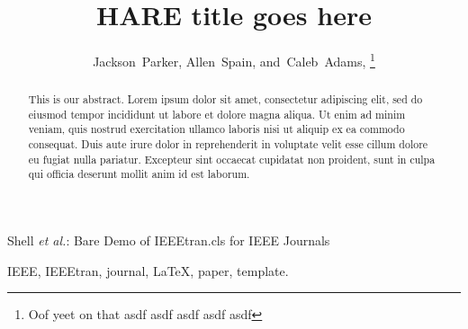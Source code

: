 \documentclass[journal]{IEEEtran}
\begin{document}
\title{HARE title goes here}

\author{Jackson~Parker,
        Allen~Spain,
        and~Caleb~Adams,
        \thanks{Oof yeet on that asdf asdf asdf asdf asdf }
        }

%
{Shell \MakeLowercase{\textit{et al.}}: Bare Demo of IEEEtran.cls for IEEE Journals}











\maketitle

\begin{abstract}
  This is our abstract. Lorem ipsum dolor sit amet, consectetur adipiscing elit,
  sed do eiusmod tempor incididunt ut labore et dolore magna aliqua. Ut enim ad
  minim veniam, quis nostrud exercitation ullamco laboris nisi ut aliquip ex ea
  commodo consequat. Duis aute irure dolor in reprehenderit in voluptate velit
  esse cillum dolore eu fugiat nulla pariatur. Excepteur sint occaecat cupidatat
  non proident, sunt in culpa qui officia deserunt mollit anim id est laborum.
\end{abstract}

\begin{IEEEkeywords}
IEEE, IEEEtran, journal, \LaTeX, paper, template.
\end{IEEEkeywords}


\IEEEpeerreviewmaketitle
\end{document}
